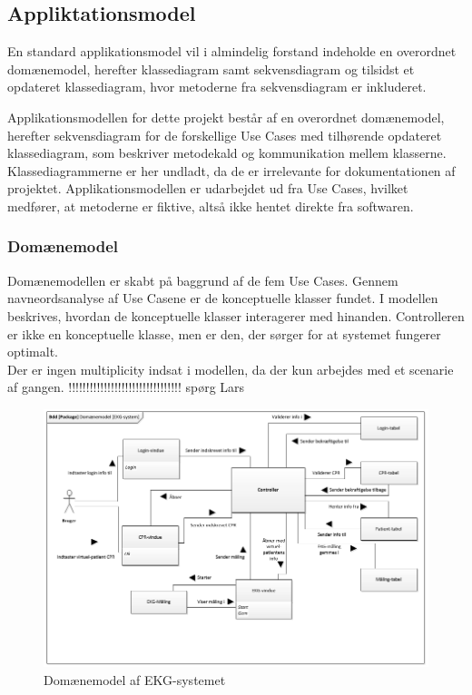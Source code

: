 \subsection{Appliktationsmodel}
En standard applikationsmodel vil i almindelig forstand indeholde en overordnet domænemodel, herefter klassediagram samt sekvensdiagram og tilsidst et opdateret klassediagram, hvor metoderne fra sekvensdiagram er inkluderet. 

Applikationsmodellen for dette projekt består af en overordnet domænemodel, herefter sekvensdiagram for de forskellige Use Cases med tilhørende opdateret klassediagram, som beskriver metodekald og kommunikation mellem klasserne. Klassediagrammerne er her undladt, da de er irrelevante for dokumentationen af projektet. Applikationsmodellen er udarbejdet ud fra Use Cases, hvilket medfører, at metoderne er fiktive, altså ikke hentet direkte fra softwaren.  

\subsubsection{Domænemodel}
Domænemodellen er skabt på baggrund af de fem Use Cases. Gennem navneordsanalyse af Use Casene er de konceptuelle klasser fundet. I modellen beskrives, hvordan de konceptuelle klasser interagerer med hinanden. Controlleren er ikke en konceptuelle klasse, men er den, der sørger for at systemet fungerer optimalt.
\\
Der er ingen multiplicity indsat i modellen, da der kun arbejdes med et scenarie af gangen. !!!!!!!!!!!!!!!!!!!!!!!!!!!!!!!! spørg Lars 

\begin{figure}[H]
	\centering
	\includegraphics[width=1\textwidth]{Figurer/Snip20150429_37}
	\caption{Domænemodel af EKG-systemet}
\end{figure}

